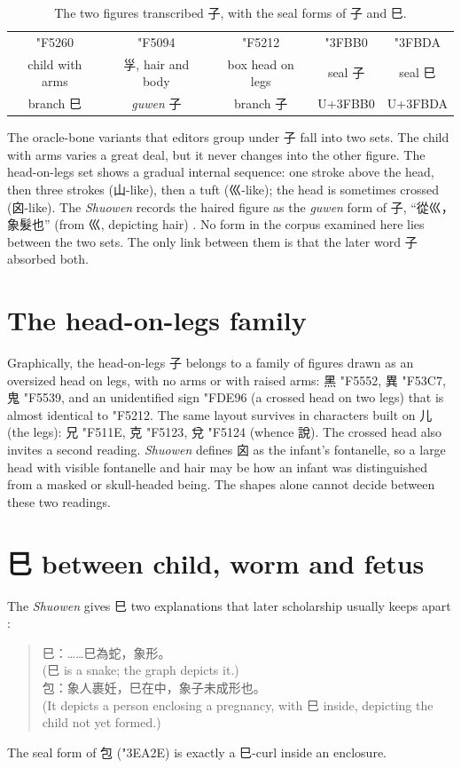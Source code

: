 \documentclass[11pt,a4paper]{article}
\newcommand{\og}[1]{{\oraclefont\char"#1}}
\newcommand{\sg}[1]{{\sealfont\char"#1}}
\newcommand{\bigog}[1]{{\oraclefont\fontsize{26}{28}\selectfont\char"#1}}
\newcommand{\bigsg}[1]{{\sealfont\fontsize{26}{28}\selectfont\char"#1}}
\newcommand{\pua}[1]{\mbox{\small U+#1}}
\begin{document}
\begin{table}[h]\centering
\caption{The two figures transcribed 子, with the seal forms of 子 and 巳.}
\begin{tabular}{ccccc}\toprule
\bigog{F5260} & \bigog{F5094} & \bigog{F5212} & \bigsg{3FBB0} & \bigsg{3FBDA}\\
child with arms & 㜽, hair and body & box head on legs & seal 子 & seal 巳\\
branch 巳 & \emph{guwen} 子 & branch 子 & \pua{3FBB0} & \pua{3FBDA}\\\bottomrule
\end{tabular}
\end{table}

The oracle-bone variants that editors group under 子 fall into two sets. The child with arms varies a great deal, but it never changes into the other figure. The head-on-legs set shows a gradual internal sequence: one stroke above the head, then three strokes (山-like), then a tuft (巛-like); the head is sometimes crossed (囟-like). The \emph{Shuowen} records the haired figure as the \emph{guwen} form of 子, ``從巛，象髮也'' (from 巛, depicting hair) \cite{shuowen}. No form in the corpus examined here lies between the two sets. The only link between them is that the later word 子 absorbed both.

\section{The head-on-legs family}
Graphically, the head-on-legs 子 belongs to a family of figures drawn as an oversized head on legs, with no arms or with raised arms: 黑 \og{F5552}, 異 \og{F53C7}, 鬼 \og{F5539}, and an unidentified sign \og{FDE96} (a crossed head on two legs) that is almost identical to \og{F5212}. The same layout survives in characters built on 儿 (the legs): 兄 \og{F511E}, 克 \og{F5123}, 兌 \og{F5124} (whence 說). The crossed head also invites a second reading. \emph{Shuowen} defines 囟 as the infant's fontanelle, so a large head with visible fontanelle and hair may be how an infant was distinguished from a masked or skull-headed being. The shapes alone cannot decide between these two readings.

\section{巳 between child, worm and fetus}
The \emph{Shuowen} gives 巳 two explanations that later scholarship usually keeps apart \cite{shuowen}:
\begin{quote}
巳：……巳為蛇，象形。\\ (巳 is a snake; the graph depicts it.)\\[4pt]
包：象人裹妊，巳在中，象子未成形也。\\ (It depicts a person enclosing a pregnancy, with 巳 inside, depicting the child not yet formed.)
\end{quote} The seal form of 包 (\sg{3EA2E}) is exactly a 巳-curl inside an enclosure.
\end{document}
